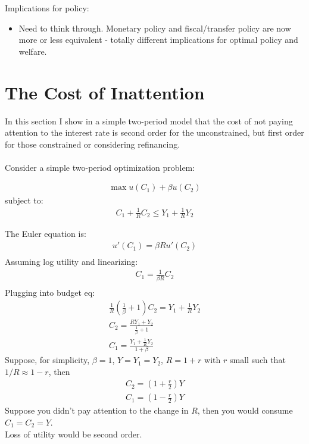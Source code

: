 \documentclass[AER]{AEA}
\begin{document}
Implications for policy:
\begin{itemize}
\item Need to think through. Monetary policy and fiscal/transfer policy are now more or less equivalent - totally different implications for optimal policy and welfare.
\end{itemize}


\section{The Cost of Inattention}
In this section I show in a simple two-period model that the cost of not paying attention to the interest rate is second order for the unconstrained, but first order for those constrained or considering refinancing.\\
\\
Consider a simple two-period optimization problem:

\begin{align*}
\max u(C_1) + \beta u(C_2)
\end{align*}
subject to:
\begin{align*}
C_1 + \frac{1}{R} C_2 \leq Y_1 + \frac{1}{R} Y_2
\end{align*}

The Euler equation is:
\begin{align*}
u'(C_1) = \beta R u'(C_2) \\
\end{align*}
Assuming log utility and linearizing:
\begin{align*}
C_1 = \frac{1}{\beta R} C_2 \\
\end{align*}
Plugging into budget eq:
\begin{align*}
\frac{1}{R}(\frac{1}{\beta} + 1 )C_2 = Y_1 + \frac{1}{R} Y_2 \\
C_2 = \frac{RY_1 +  Y_2}{\frac{1}{\beta} + 1 } \\
C_1 = \frac{Y_1 + \frac{1}{R} Y_2}{1 + \beta }
\end{align*}
Suppose, for simplicity, $\beta = 1$, $Y=Y_1=Y_2$, $R= 1+r$ with $r$ small such that $1/R \approx  1-r$, then
\begin{align*}
C_2 = (1+\frac{r}{2}) Y \\
C_1 = (1-\frac{r}{2 }) Y
\end{align*}
Suppose you didn't pay attention to the change in $R$, then you would consume $C_1=C_2=Y$.\\
Loss of utility would be second order.
\end{document}
